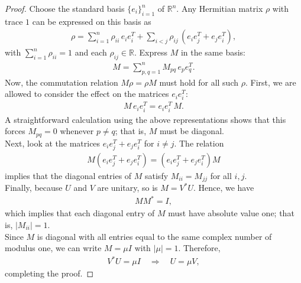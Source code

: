 \documentclass[10pt,a4paper]{amsart}
\begin{document}
\begin{proof}
        Choose the standard basis $\{e_i\}_{i=1}^n$ of $\mathbb{R}^n$. Any Hermitian matrix $\rho$ with trace $1$ can be expressed on this basis as
        \begin{eqnarray*}
        \rho = \sum_{i=1}^n \rho_{ii}\, e_i e_i^T + \sum_{i<j} \rho_{ij}\, (e_i e_j^T + e_j e_i^T),
        \end{eqnarray*}
        with $\sum_{i=1}^n \rho_{ii}=1$ and each $\rho_{ij}\in\mathbb{R}$.
        Express $M$ in the same basis:
        \begin{eqnarray*}
        M = \sum_{p,q=1}^n M_{pq}\, e_p e_q^T.
        \end{eqnarray*}
        Now, the commutation relation $M\rho = \rho M$ must hold for all such $\rho$. First, we are allowed to consider the effect on the matrices $e_i e_i^T$:
        \begin{eqnarray*}
        M\, e_i e_i^T = e_i e_i^T\, M.
        \end{eqnarray*}
        A straightforward calculation using the above representations shows that this forces $M_{pq} = 0$ whenever $p \neq q$; that is, $M$ must be diagonal.\\
        Next, look at the matrices $e_i e_j^T + e_j e_i^T$ for $i\neq j$. The relation
        \begin{eqnarray*}
        M(e_i e_j^T+e_j e_i^T) = (e_i e_j^T+e_j e_i^T) M
        \end{eqnarray*}
        implies that the diagonal entries of $M$ satisfy $M_{ii} = M_{jj}$ for all $i, j$.\\
        Finally, because $U$ and $V$ are unitary, so is $M = V^* U$. Hence, we have
        \begin{eqnarray*}
        MM^* = I,
        \end{eqnarray*}
        which implies that each diagonal entry of $M$ must have absolute value one; that is, $|M_{ii}|=1$.\\
        Since $M$ is diagonal with all entries equal to the same complex number of modulus one, we can write $M=\mu I$ with $|\mu|=1$. Therefore,
        \begin{eqnarray*}
        V^* U = \mu I \quad \Longrightarrow \quad U = \mu V,
        \end{eqnarray*}
        completing the proof.
    \end{proof}
\end{document}
